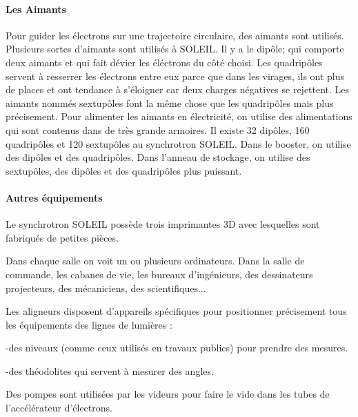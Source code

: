 			\paragraph{Les Aimants}
				Pour guider les électrons sur une trajectoire circulaire, des aimants sont utilisés. Plusieurs sortes d'aimants sont utilisés à SOLEIL. Il y a le dipôle; qui comporte deux aimants et qui fait dévier les éléctrons du côté choisi. Les quadripôles servent à resserrer les électrons entre eux parce que dans les virages, ils ont plus de places et ont tendance à s'éloigner car deux charges négatives se rejettent. Les aimants nommés sextupôles font la même chose que les quadripôles mais plus précisement. Pour alimenter les aimants en électricité, on utilise des alimentations qui sont contenus dans de très grande armoires. Il existe 32 dipôles, 160 quadripôles et 120 sextupôles au synchrotron SOLEIL. Dans le booster, on utilise des dipôles et des quadripôles.
				Dans l'anneau de stockage, on utilise des sextupôles, des dipôles et des quadripôles plus puissant. 
			
			\paragraph{Autres équipements}
				Le synchrotron SOLEIL possède trois imprimantes 3D avec lesquelles sont fabriqués de petites pièces.

				Dans chaque salle on voit un ou plusieurs ordinateurs. Dans la salle de commande, les cabanes de vie, les bureaux d'ingénieurs, des dessinateurs projecteurs, des mécaniciens, des scientifiques... 

				Les aligneurs disposent d'appareils spécifiques pour positionner précisement tous les équipements des lignes de lumières :

				 -des niveaux (comme ceux utilisés en travaux publics) pour prendre des mesures.
				 
				 -des théodolites qui servent à mesurer des angles.
				
				Des pompes sont utilisées par les videurs pour faire le vide dans les tubes de l'accélérateur d'électrons.





%
%